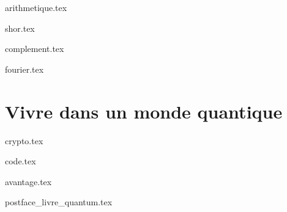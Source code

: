 \documentclass[10pt,twoside,openright]{report}
\begin{document}
{arithmetique.tex}

{shor.tex}

{complement.tex}

{fourier.tex}

\clearemptydoublepage
\part{Vivre dans un monde quantique}

{crypto.tex}

{code.tex}

{avantage.tex}





\clearemptydoublepage

{postface_livre_quantum.tex}


~\vfill
\bigskip

\end{document}
